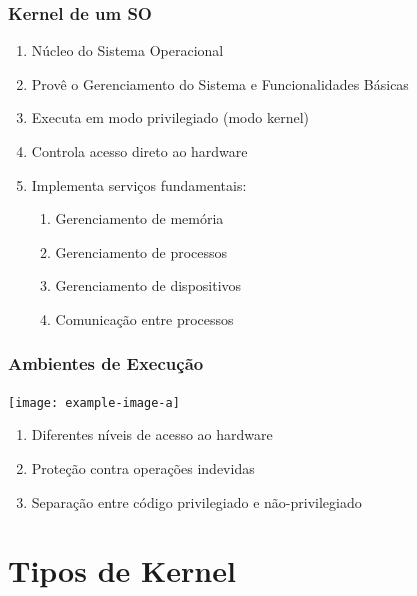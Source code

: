 \documentclass{beamer}
\begin{document}
\begin{frame}[fragile]
\frametitle{Kernel de um SO}

\begin{enumerate}\small
    \item Núcleo do Sistema Operacional
    \item Provê o Gerenciamento do Sistema e Funcionalidades Básicas
    \item Executa em modo privilegiado (modo kernel)
    \item Controla acesso direto ao hardware
    \item Implementa serviços fundamentais:
    \begin{enumerate}\footnotesize
        \item Gerenciamento de memória
        \item Gerenciamento de processos
        \item Gerenciamento de dispositivos
        \item Comunicação entre processos
    \end{enumerate}
\end{enumerate}
\end{frame}

\begin{frame}[fragile]
\frametitle{Ambientes de Execução}

\begin{center}
    \texttt{[image: example-image-a]}
\end{center}

\begin{enumerate}\small
    \item Diferentes níveis de acesso ao hardware
    \item Proteção contra operações indevidas
    \item Separação entre código privilegiado e não-privilegiado
\end{enumerate}
\end{frame}

\section{Tipos de Kernel}
\end{document}
